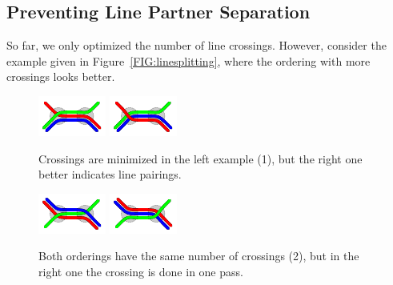 \documentclass{llncs}
\begin{document}
\subsection{Preventing Line Partner Separation}\label{SEC:separation}
So far, we only optimized the number of line crossings. However, consider the example given in Figure~\ref{FIG:linesplitting}, where the ordering with more crossings looks better.
\begin{figure}[t]
\centering
\begin{minipage}{.48\textwidth}
  \centering
	\includegraphics[angle=270,origin=c,width=.3\textwidth]{render_examples/splitting_example_nonopt.pdf}\hspace{10pt}
	\includegraphics[angle=270,origin=c,width=.3\textwidth]{render_examples/splitting_example.pdf}
	\caption{Crossings are minimized in the left example (1), but the right one better indicates line pairings.}
	\label{FIG:linesplitting}
\end{minipage}%
\hfill
\begin{minipage}{.48\textwidth}
  \centering
	\includegraphics[angle=90,origin=c,width=.3\textwidth]{render_examples/splitting_example2_nonopt.pdf}\hspace{10pt}
	\includegraphics[angle=90,origin=c,width=.3\textwidth]{render_examples/splitting_example2.pdf}
	\caption{Both orderings have the same number of crossings (2), but in the right one the
crossing is done in one pass.}
	\label{FIG:linesplitting2}
\end{minipage}
\end{figure}
\end{document}
